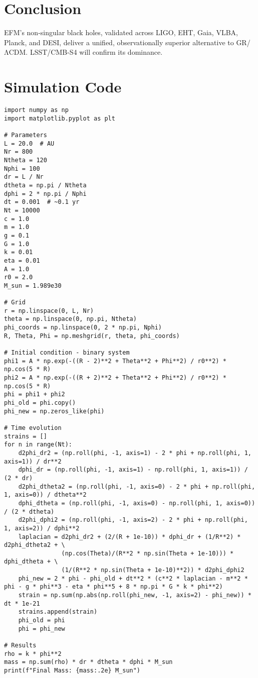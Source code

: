 \documentclass[11pt]{article}
\begin{document}
\section{Conclusion}
EFM’s non-singular black holes, validated across LIGO, EHT, Gaia, VLBA, Planck, and DESI, deliver a unified, observationally superior alternative to GR/ΛCDM. LSST/CMB-S4 will confirm its dominance.

\appendix
\section{Simulation Code}
\lstset{language=Python, basicstyle=\footnotesize\ttfamily, breaklines=true, numbers=left}
\begin{lstlisting}
import numpy as np
import matplotlib.pyplot as plt

# Parameters
L = 20.0  # AU
Nr = 800
Ntheta = 120
Nphi = 100
dr = L / Nr
dtheta = np.pi / Ntheta
dphi = 2 * np.pi / Nphi
dt = 0.001  # ~0.1 yr
Nt = 10000
c = 1.0
m = 1.0
g = 0.1
G = 1.0
k = 0.01
eta = 0.01
A = 1.0
r0 = 2.0
M_sun = 1.989e30

# Grid
r = np.linspace(0, L, Nr)
theta = np.linspace(0, np.pi, Ntheta)
phi_coords = np.linspace(0, 2 * np.pi, Nphi)
R, Theta, Phi = np.meshgrid(r, theta, phi_coords)

# Initial condition - binary system
phi1 = A * np.exp(-((R - 2)**2 + Theta**2 + Phi**2) / r0**2) * np.cos(5 * R)
phi2 = A * np.exp(-((R + 2)**2 + Theta**2 + Phi**2) / r0**2) * np.cos(5 * R)
phi = phi1 + phi2
phi_old = phi.copy()
phi_new = np.zeros_like(phi)

# Time evolution
strains = []
for n in range(Nt):
    d2phi_dr2 = (np.roll(phi, -1, axis=1) - 2 * phi + np.roll(phi, 1, axis=1)) / dr**2
    dphi_dr = (np.roll(phi, -1, axis=1) - np.roll(phi, 1, axis=1)) / (2 * dr)
    d2phi_dtheta2 = (np.roll(phi, -1, axis=0) - 2 * phi + np.roll(phi, 1, axis=0)) / dtheta**2
    dphi_dtheta = (np.roll(phi, -1, axis=0) - np.roll(phi, 1, axis=0)) / (2 * dtheta)
    d2phi_dphi2 = (np.roll(phi, -1, axis=2) - 2 * phi + np.roll(phi, 1, axis=2)) / dphi**2
    laplacian = d2phi_dr2 + (2/(R + 1e-10)) * dphi_dr + (1/R**2) * d2phi_dtheta2 + \
                (np.cos(Theta)/(R**2 * np.sin(Theta + 1e-10))) * dphi_dtheta + \
                (1/(R**2 * np.sin(Theta + 1e-10)**2)) * d2phi_dphi2
    phi_new = 2 * phi - phi_old + dt**2 * (c**2 * laplacian - m**2 * phi - g * phi**3 - eta * phi**5 + 8 * np.pi * G * k * phi**2)
    strain = np.sum(np.abs(np.roll(phi_new, -1, axis=2) - phi_new)) * dt * 1e-21
    strains.append(strain)
    phi_old = phi
    phi = phi_new

# Results
rho = k * phi**2
mass = np.sum(rho) * dr * dtheta * dphi * M_sun
print(f"Final Mass: {mass:.2e} M_sun")
\end{lstlisting}
\end{document}
